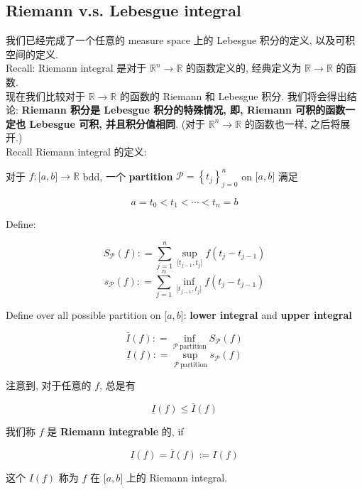 \documentclass{qlnotes-export}
\begin{document}
\subsection{Riemann v.s. Lebesgue integral}\label{riemann-v.s.-lebesgue-integral}

我们已经完成了一个任意的 measure space 上的 Lebesgue 积分的定义, 以及可积空间的定义.\\
Recall: Riemann integral 是对于 \({\mathbb{R}}^{n}\rightarrow{\mathbb{R}}\) 的函数定义的, 经典定义为 \({\mathbb{R}}\rightarrow{\mathbb{R}}\) 的函数.\\
现在我们比较对于 \({\mathbb{R}}\rightarrow{\mathbb{R}}\) 的函数的 Riemann 和 Lebesgue 积分. 我们将会得出结论: \textbf{Riemann 积分是 Lebesgue 积分的特殊情况, 即, Riemann 可积的函数一定也 Lebesgue 可积, 并且积分值相同}. (对于 \({\mathbb{R}}^{n}\rightarrow{\mathbb{R}}\) 的函数也一样, 之后将展开.)\\
Recall Riemann integral 的定义:

\begin{definition}\label{def-05-integration-of-real-and-complex-functions-definition-007}

对于 \(f:\lbrack a,b\rbrack\rightarrow{\mathbb{R}}\) bdd, 一个 \textbf{partition} \(\mathcal{P} = \left\{ t_{j} \right\}_{j = 0}^{n}\) on \(\lbrack a,b\rbrack\) 满足

\[a = t_{0} < t_{1} < \cdots < t_{n} = b\]

Define:

\[S_{\mathcal{P}}(f): = \sum\limits_{j = 1}^{n}\sup\limits_{\lbrack t_{j - 1},t_{j}\rbrack}f(t_{j} - t_{j - 1})\]\[s_{\mathcal{P}}(f): = \sum\limits_{j = 1}^{n}\inf\limits_{\lbrack t_{j - 1},t_{j}\rbrack}f(t_{j} - t_{j - 1})\]

Define over all possible partition on \(\lbrack a,b\rbrack\): \textbf{lower integral} and \textbf{upper integral}

\[\bar{I}(f): = \inf\limits_{\mathcal{P}\ \text{partition}}S_{\mathcal{P}}(f)\]\[\underset{¯}{I}(f): = \sup\limits_{\mathcal{P}\ \text{partition}}s_{\mathcal{P}}(f)\]

注意到, 对于任意的 \(f\), 总是有

\[\underset{¯}{I}(f) \leq \bar{I}(f)\]

我们称 \(f\) 是 \textbf{Riemann integrable} 的, if

\[\underset{¯}{I}(f) = \bar{I}(f) := I(f)\]

这个 \(I(f)\) 称为 \(f\) 在 \(\lbrack a,b\rbrack\) 上的 Riemann integral.

\end{definition}
\end{document}
